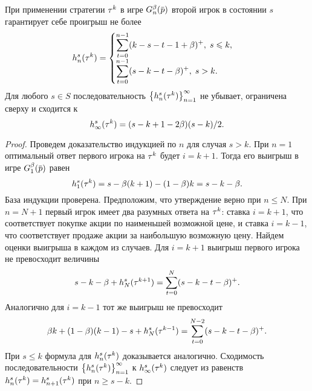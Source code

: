 {\begin{lemma}
  \label{ch2:upper-bound:lemma:vector-payoffs}
  При применении стратегии $\tau^k$ в игре $\theG{n}(\pd)$ второй игрок в состоянии $s$ гарантирует себе проигрыш не более
  \begin{gather*}
    h^s_n(\tau^k) = \begin{cases}
      \displaystyle \sum_{t=0}^{n-1} (k-s-t-1+\beta)^+, \; s \leqslant k, \\
      \displaystyle \sum_{t=0}^{n-1} (s-k-t-\beta)^+, \; s > k.
    \end{cases} 
  \end{gather*}
  Для любого $s \in S$ последовательность $\left\{ h^s_n(\tau^k) \right\}_{n = 1}^\infty$ не убывает, ограничена сверху и сходится к %
  \begin{equation}
    \label{ch2:upper-bound:eq:max-payoff}
    h^s_\infty(\tau^k) = (s - k + 1 - 2\beta)(s-k)/2.
  \end{equation}
\end{lemma}
\begin{proof}
  Проведем доказательство индукцией по $n$ для случая $s > k$.
  При $n = 1$ оптимальный ответ первого игрока на $\tau^k$ будет $i = k + 1$.
  Тогда его выигрыш в игре $\theG{1}(\pd)$ равен
  \begin{equation*}
    h^s_1(\tau^k) = s - \beta(k+1) - (1-\beta)k = s - k - \beta.
  \end{equation*}
  База индукции проверена.
  Предположим, что утверждение верно при $n \leqslant N$.
  При $n = N + 1$ первый игрок имеет два разумных ответа на $\tau^k$: ставка $i=k+1$, что соответствует покупке акции по наименьшей возможной цене, и ставка $i=k-1$, что соответствует продаже акции за наибольшую возможную цену.
  Найдем оценки выигрыша в каждом из случаев.
  Для $i=k+1$ выигрыш первого игрока не превосходит величины
  \begin{equation*}
    s - k - \beta + h^s_N(\tau^{k+1}) = \sum_{t=0}^N(s-k-t-\beta)^+.
  \end{equation*}
  Аналогично для $i = k - 1$ тот же выигрыш не превосходит
  \begin{equation*}
    \beta k + (1-\beta)(k-1) - s + h^s_N(\tau^{k-1}) = \sum_{t=0}^{N-2}(s-k-t-\beta)^+.
  \end{equation*}
  При $s \leqslant k$ формула для $h^s_n(\tau^k)$ доказывается аналогично.
  Сходимость последовательности $\left\{  h^s_n(\tau^k) \right\}_{n=1}^\infty$ к $h^s_\infty(\tau^k)$ следует из равенств
  $h^s_n(\tau^k) = h^s_{n+1}(\tau^k)$ при $n \geqslant s - k$.
\end{proof}

}
